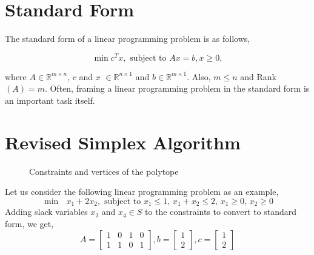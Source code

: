 \documentclass[12pt,letterpaper]{article}
\newcommand{\R}{\mathbb{R}}
\begin{document}
\section{Standard Form}

The standard form of a linear programming problem is as follows,

\begin{equation*}
\min c^{T}x, \text{ subject to } Ax = b, x \geq 0,
\end{equation*}

where $A \in \R^{m \times n}$, $c$ and $x$ $\in \R^{n\times1}$ and $b \in \R^{m\times1}$. Also, $m \leq n$ and Rank$(A) = m$. Often, framing a linear programming problem in the standard form is an important task itself.

\section{Revised Simplex Algorithm}

\begin{figure}[h]
	\centering
	\caption{Constraints and vertices of the polytope}
	\label{fig1}
\end{figure}

Let us consider the following linear programming problem as an example, 
\begin{equation*}
\min \text{ } x_1+2x_2, \text{ subject to } x_1 \leq 1 \text{, } x_1 + x_2 \leq 2\text{, } x_1 \geq 0\text{, } x_2 \geq 0
\end{equation*}
Adding slack variables $x_3$ and $x_4 \in S$ to the constraints to convert to standard form, we get,
\[
A =  \begin{bmatrix}
1 & 0 & 1 & 0 \\
1 & 1 & 0 & 1
\end{bmatrix}
, b = \begin{bmatrix}
1 \\
2
\end{bmatrix}
, c = \begin{bmatrix}
1 \\
2
\end{bmatrix}
\]
\end{document}
